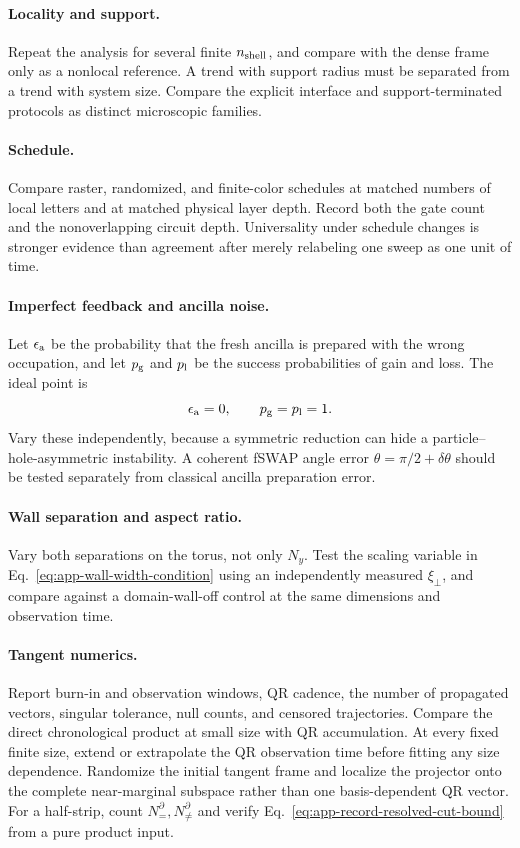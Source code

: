 \paragraph*{Locality and support.}
Repeat the analysis for several finite \(n_{\rm shell}\), and compare with
the dense frame only as a nonlocal reference.  A trend with support radius
must be separated from a trend with system size.  Compare the explicit
interface and support-terminated protocols as distinct microscopic
families.

\paragraph*{Schedule.}
Compare raster, randomized, and finite-color schedules at matched numbers of
local letters and at matched physical layer depth.  Record both the gate
count and the nonoverlapping circuit depth.  Universality under schedule
changes is stronger evidence than agreement after merely relabeling one
sweep as one unit of time.

\paragraph*{Imperfect feedback and ancilla noise.}
Let \(\epsilon_{\rm a}\) be the probability that the fresh ancilla is
prepared with the wrong occupation, and let \(p_{\rm g}\) and \(p_{\rm l}\)
be the success probabilities of gain and loss.  The ideal point is
\begin{equation}
    \epsilon_{\rm a}=0,
    \qquad p_{\rm g}=p_{\rm l}=1.
\end{equation}
Vary these independently, because a symmetric reduction can hide a
particle--hole-asymmetric instability.  A coherent fSWAP angle error
\(\theta=\pi/2+\delta\theta\) should be tested separately from classical
ancilla preparation error.

\paragraph*{Wall separation and aspect ratio.}
Vary both separations on the torus, not only \(N_y\).  Test the scaling
variable in Eq.~\eqref{eq:app-wall-width-condition} using an independently
measured \(\xi_\perp\), and compare against a domain-wall-off control at the
same dimensions and observation time.

\paragraph*{Tangent numerics.}
Report burn-in and observation windows, QR cadence, the number of propagated
vectors, singular tolerance, null counts, and censored trajectories.
Compare the direct chronological product at small size with QR accumulation.
At every fixed finite size, extend or extrapolate the QR observation time
before fitting any size dependence.  Randomize the initial tangent frame and
localize the projector onto the complete near-marginal subspace rather than
one basis-dependent QR vector.
For a half-strip, count \(N_=^\partial,N_{\ne}^\partial\) and verify
Eq.~\eqref{eq:app-record-resolved-cut-bound} from a pure product input.

